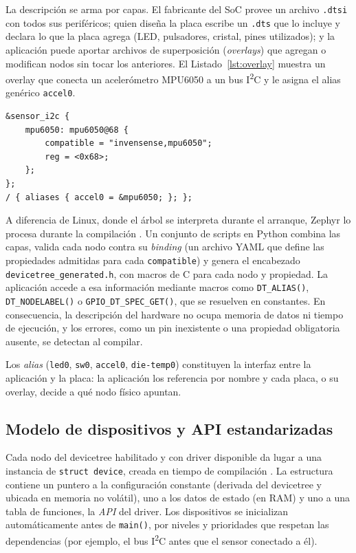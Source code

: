 La descripción se arma por capas. El fabricante del SoC provee un archivo \texttt{.dtsi} con todos sus periféricos; quien diseña la placa escribe un \texttt{.dts} que lo incluye y declara lo que la placa agrega (LED, pulsadores, cristal, pines utilizados); y la aplicación puede aportar archivos de superposición (\emph{overlays}) que agregan o modifican nodos sin tocar los anteriores. El Listado~\ref{lst:overlay} muestra un overlay que conecta un acelerómetro MPU6050 a un bus I\textsuperscript{2}C y le asigna el alias genérico \texttt{accel0}.

\begin{lstlisting}[language=dts, caption={Overlay que agrega un MPU6050 al bus I\textsuperscript{2}C definido por la placa.}, label=lst:overlay, captionpos=t]
&sensor_i2c {
    mpu6050: mpu6050@68 {
        compatible = "invensense,mpu6050";
        reg = <0x68>;
    };
};
/ { aliases { accel0 = &mpu6050; }; };
\end{lstlisting}

A diferencia de Linux, donde el árbol se interpreta durante el arranque, Zephyr lo procesa durante la compilación \cite{zephyr_dt_guide}. Un conjunto de scripts en Python combina las capas, valida cada nodo contra su \emph{binding} (un archivo YAML que define las propiedades admitidas para cada \texttt{compatible}) y genera el encabezado \texttt{devicetree\_generated.h}, con macros de C para cada nodo y propiedad. La aplicación accede a esa información mediante macros como \texttt{DT\_ALIAS()}, \texttt{DT\_NODELABEL()} o \texttt{GPIO\_DT\_SPEC\_GET()}, que se resuelven en constantes. En consecuencia, la descripción del hardware no ocupa memoria de datos ni tiempo de ejecución, y los errores, como un pin inexistente o una propiedad obligatoria ausente, se detectan al compilar.

Los \emph{alias} (\texttt{led0}, \texttt{sw0}, \texttt{accel0}, \texttt{die-temp0}) constituyen la interfaz entre la aplicación y la placa: la aplicación los referencia por nombre y cada placa, o su overlay, decide a qué nodo físico apuntan.

\subsection{Modelo de dispositivos y API estandarizadas}

Cada nodo del devicetree habilitado y con driver disponible da lugar a una instancia de \texttt{struct device}, creada en tiempo de compilación \cite{zephyr_device_model}. La estructura contiene un puntero a la configuración constante (derivada del devicetree y ubicada en memoria no volátil), uno a los datos de estado (en RAM) y uno a una tabla de funciones, la \emph{API} del driver. Los dispositivos se inicializan automáticamente antes de \texttt{main()}, por niveles y prioridades que respetan las dependencias (por ejemplo, el bus I\textsuperscript{2}C antes que el sensor conectado a él).

